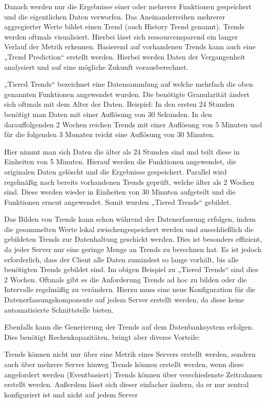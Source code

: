 Danach werden nur die Ergebnisse einer oder mehrerer Funktionen gespeichert und
die eigentlichen Daten verworfen. Das Aneinanderreihen mehrerer aggregierter
Werte bildet einen Trend (auch History Trend genannt). Trends werden oftmals
visualisiert. Hierbei lässt sich ressourcensparend ein langer Verlauf der
Metrik erkennen. Basierend auf vorhandenen Trends kann auch eine „Trend
Prediction“ erstellt werden. Hierbei werden Daten der Vergangenheit analysiert
und auf eine mögliche Zukunft vorausberechnet.

„Tiered Trends“ bezeichnet eine Datensammlung auf welche mehrfach die oben
genannten Funktionen angewendet wurden. Die benötigte Granularität ändert sich
oftmals mit dem Alter der Daten. Beispiel: In den ersten 24 Stunden benötigt
man Daten mit einer Auflösung von 30 Sekunden. In den darauffolgenden 2 Wochen
reichen Trends mit einer Auflösung von 5 Minuten und für die folgenden 3
Monaten reicht eine Auflösung von 30 Minuten.

Hier nimmt man sich Daten die älter als 24 Stunden sind und teilt diese in
Einheiten von 5 Minuten. Hierauf werden die Funktionen angewendet, die
originalen Daten gelöscht und die Ergebnisse gespeichert. Parallel wird
regelmäßig nach bereits vorhandenen Trends geprüft, welche älter als 2 Wochen
sind. Diese werden wieder in Einheiten von 30 Minuten aufgeteilt und die
Funktionen erneut angewendet. Somit wurden „Tiered Trends“ gebildet.

Das Bilden von Trends kann schon während der Datenerfassung erfolgen, indem die
gesammelten Werte lokal zwischengespeichert werden und ausschließlich die
gebildeten Trends zur Datenhaltung geschickt werden. Dies ist besonders
effizient, da jeder Server nur eine geringe Menge an Trends zu berechnen hat.
Es ist jedoch erforderlich, dass der Client alle Daten zumindest so lange
vorhält, bis alle benötigten Trends gebildet sind. Im obigen Beispiel zu
„Tiered Trends“ sind dies 2 Wochen. Oftmals gibt es die Anforderung Trends ad
hoc zu bilden oder die Intervalle regelmäßig zu verändern. Hierzu muss eine
neue Konfiguration für die Datenerfassungskomponente auf jedem Server erstellt
werden, da diese keine automatisierte Schnittstelle bieten.

Ebenfalls kann die Generierung der Trends auf dem Datenbanksystem erfolgen.
Dies benötigt Rechenkapazitäten, bringt aber diverse Vorteile:

\begin{outline}
  \1 Trends können nicht nur über eine Metrik eines Servers erstellt werden,
  sondern auch über mehrere Server hinweg
  \1 Trends können erstellt werden, wenn diese angefordert werden
  (Eventbasiert)
  \1 Trends können über verschiedenste Zeitrahmen erstellt werden. Außerdem
  lässt sich dieser einfacher ändern, da er nur zentral konfiguriert ist und
  nicht auf jedem Server
\end{outline}

